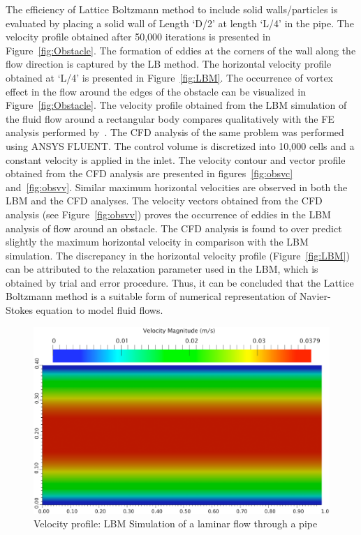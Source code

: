 The efficiency of Lattice Boltzmann method to include solid walls/particles is evaluated by placing a solid wall of Length `D/2' at length `L/4' in the pipe. The velocity profile obtained after 50,000 iterations is presented in Figure~\ref{fig:Obstacle}. The formation of eddies at the corners of the wall along the flow direction is captured by the LB method. The horizontal velocity profile obtained at `L/4' is presented in Figure~\ref{fig:LBM}. The occurrence of vortex effect in the flow around the edges of the obstacle can be visualized in Figure~\ref{fig:Obstacle}. The velocity profile obtained from the LBM simulation of the fluid flow around a rectangular body compares qualitatively with the FE analysis performed by~\citet{zhong1991}. The CFD analysis of the same problem was performed using ANSYS FLUENT. The control volume is discretized into 10,000 cells and a constant velocity is applied in the inlet. The velocity contour and vector profile obtained from the CFD analysis are presented in figures~\ref{fig:obsvc} and~\ref{fig:obsvv}. Similar maximum horizontal velocities are observed in both the LBM and the CFD analyses. The velocity vectors obtained from the CFD analysis (see Figure~\ref{fig:obsvv}) proves the occurrence of eddies in the LBM analysis of flow around an obstacle. The CFD analysis is found to over predict slightly the maximum horizontal velocity in comparison with the LBM simulation. The discrepancy in the horizontal velocity profile (Figure~\ref{fig:LBM}) can be attributed to the relaxation parameter used in the LBM, which is obtained by trial and error procedure. Thus, it can be concluded that the Lattice Boltzmann method is a suitable form of numerical representation of Navier-Stokes equation to model fluid flows. 
\begin{figure}[h]
\centering
\includegraphics[width=\textwidth]{Chapter3/figures/lbm/LBM_Poiseuille.png}
\caption{Velocity profile: LBM Simulation of a laminar flow through a pipe}
\label{fig:LBM_Poiseuille}
\end{figure}

